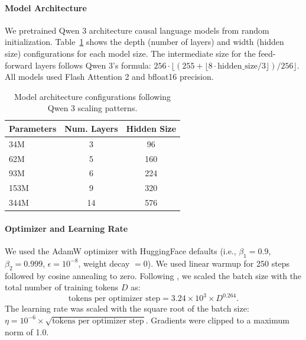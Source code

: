 \paragraph{Model Architecture}
We pretrained Qwen 3 \citep{yang2025qwen3technicalreport} architecture causal language models from random initialization.
Table~\ref{tab:model_architectures} shows the depth (number of layers) and width (hidden size) configurations for each model size.
The intermediate size for the feed-forward layers follows Qwen 3's formula: $256 \cdot \lfloor (255 + \lfloor 8 \cdot \text{hidden\_size} / 3 \rfloor) / 256 \rfloor$.
All models used Flash Attention 2 \citep{dao2023flashattention2fasterattentionbetter} and bfloat16 precision.

\begin{table}[h]
\centering
\caption{Model architecture configurations following Qwen 3 scaling patterns.}
\label{tab:model_architectures}
\begin{tabular}{lcc}
\toprule
Parameters & Num. Layers & Hidden Size \\
\midrule
34M  & 3  & 96  \\
62M  & 5  & 160 \\
93M  & 6  & 224 \\
153M & 9  & 320 \\
344M & 14 & 576 \\
\bottomrule
\end{tabular}
\end{table}

\paragraph{Optimizer and Learning Rate}
We used the AdamW optimizer \citep{loshchilovde2019adamw} with HuggingFace defaults (i.e., $\beta_1 = 0.9$, $\beta_2 = 0.999$, $\epsilon = 10^{-8}$, weight decay $= 0$).
We used linear warmup for 250 steps followed by cosine annealing to zero.
Following \citet{shuai2024scalinglawlanguagemodels}, we scaled the batch size with the total number of training tokens $D$ as:
\begin{equation}
    \text{tokens per optimizer step} = 3.24 \times 10^3 \times D^{0.264}.
\end{equation}
The learning rate was scaled with the square root of the batch size: $\eta = 10^{-6} \times \sqrt{\text{tokens per optimizer step}}$.
Gradients were clipped to a maximum norm of 1.0.

